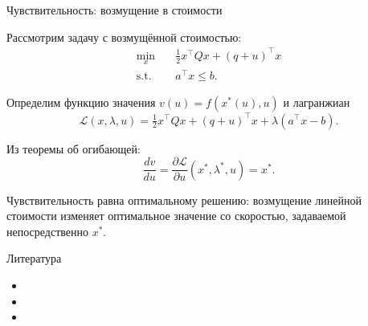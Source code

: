 \documentclass{beamer}
\begin{document}
\begin{frame}{Чувствительность: возмущение в стоимости}
	\begin{flushleft}
		
		Рассмотрим задачу с возмущённой стоимостью:
		\begin{equation*}
			\begin{aligned}
				\min_x \quad & \tfrac{1}{2} x^\top Q x + (q+u)^\top x \\
				\text{s.t.} \quad & a^\top x \le b.
			\end{aligned}
		\end{equation*}
		
		Определим функцию значения $v(u) = f(x^*(u), u)$ и лагранжиан
		\begin{equation*}
			\mathcal{L}(x,\lambda,u) = \tfrac{1}{2} x^\top Q x + (q+u)^\top x + \lambda (a^\top x - b).
		\end{equation*}
		
		Из теоремы об огибающей:
		\begin{equation*}
			\frac{dv}{du} = \frac{\partial \mathcal{L}}{\partial u}(x^*, \lambda^*, u) = x^*.
		\end{equation*}
		
		Чувствительность равна оптимальному решению: возмущение линейной стоимости изменяет оптимальное значение со скоростью, задаваемой непосредственно $x^*$.
		
	\end{flushleft}
\end{frame}





\begin{frame}{Литература}
	\begin{flushleft}
		
		\begin{itemize}
			\item {}
			
			\item {}
			
			\item {}
		\end{itemize}
		
		
		
		
		
		
	\end{flushleft}
\end{frame}






\myqrframe
\end{document}
